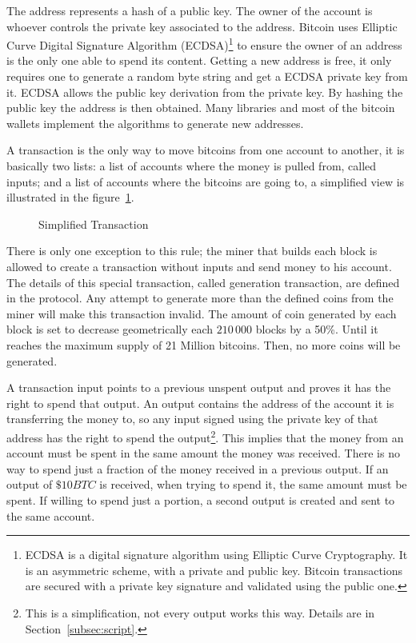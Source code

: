 The address represents a hash of a public key. The owner of the account is
  whoever controls the private key associated to the address.
Bitcoin uses Elliptic Curve Digital Signature Algorithm (ECDSA)\footnote{%
  ECDSA is a digital signature algorithm using Elliptic Curve
    Cryptography. It is an asymmetric scheme, with a private and public key.
    Bitcoin transactions are secured with a private key signature and validated
    using the public one.} to ensure the owner of an address is the only one able
  to spend its content.
Getting a new address is free, it only requires one to generate a random byte
  string and get a ECDSA private key from it. ECDSA allows the public key
  derivation from the private key.
By hashing the public key the address is then obtained.
Many libraries and most of the bitcoin wallets implement the algorithms to
  generate new addresses.

A transaction is the only way to move bitcoins from one account to another,
  it is basically two lists:
  a list of accounts where the money is pulled from, called inputs; and a list
  of accounts where the bitcoins are going to, a simplified
  view is illustrated in the figure~\ref{fig:simplified_transaction}.

\begin{figure}
	\centering
	
	\caption{Simplified Transaction}
	\label{fig:simplified_transaction}
\end{figure}

There is only one exception to this rule; the miner that builds each block is
  allowed to create a transaction without inputs and send money to his account.
The details of this special transaction, called generation transaction, are
  defined in the protocol.
Any attempt to generate more than the defined coins from the miner will make
  this transaction invalid.
The amount of coin generated by each block is set to decrease geometrically
  each $210\,000$ blocks by a 50\%.
Until it reaches the maximum supply of 21 Million bitcoins.
Then, no more coins will be generated.

A transaction input points to a previous unspent output and proves it has the
  right to spend that output.
An output contains the address of the account it is transferring the money to,
  so any input signed using the private key of that address has the right to
  spend the output\footnote{This is a simplification, not every output works
  this way. Details are in Section~\ref{subsec:script}.}.
This implies that the money from an account must be spent in the same amount
  the money was received. There is no way to spend just a fraction of the money
  received in a previous output. If an output of $\$ 10BTC$ is received, when
  trying to spend it, the same amount must be spent. If willing to spend just a
  portion, a second output is created and sent to the same account.

